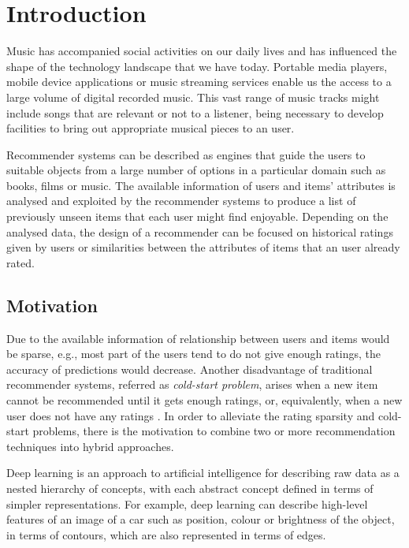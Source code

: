 \setcounter{page}{1}
\chapter{Introduction}
Music has accompanied social activities on our daily lives and has influenced the shape of the technology landscape that we have today. Portable media players, mobile device applications or music streaming services enable us the access to a large volume of digital recorded music. This vast range of music tracks might include songs that are relevant or not to a listener, being necessary to develop facilities to bring out appropriate musical pieces to an user.

Recommender systems can be described as engines that guide the users to suitable objects from a large number of options in a particular domain such as books, films or music. The available information of users and items' attributes is analysed and exploited by the recommender systems to produce a list of previously unseen items that each user might find enjoyable. Depending on the analysed data, the design of a recommender can be focused on historical ratings given by users or similarities between the attributes of items that an user already rated.

\section{Motivation}
Due to the available information of relationship between users and items would be sparse, e.g., most part of the users tend to do not give enough ratings, the accuracy of predictions would decrease. Another disadvantage of traditional recommender systems, referred as \textit{cold-start problem}, arises when a new item cannot be recommended until it gets enough ratings, or, equivalently, when a new user does not have any ratings \parencite{melville2010recommender}. In order to alleviate the rating sparsity and cold-start problems, there is the motivation to combine two or more recommendation techniques into hybrid approaches. 

Deep learning is an approach to artificial intelligence for describing raw data as a nested hierarchy of concepts, with each abstract concept defined in terms of simpler representations. For example, deep learning can describe high-level features of an image of a car such as position, colour or brightness of the object, in terms of contours, which are also represented in terms of edges. \parencite{Bengio-et-al-2015-Book}  

